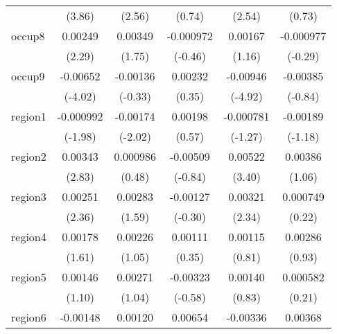 \begin{table}[htbp]
\begin{tabular}{l*{5}{c}}
            &      (3.86)         &      (2.56)         &      (0.74)         &      (2.54)         &      (0.73)         \\
occup8      &     0.00249\sym{*}  &     0.00349         &   -0.000972         &     0.00167         &   -0.000977         \\
            &      (2.29)         &      (1.75)         &     (-0.46)         &      (1.16)         &     (-0.29)         \\
occup9      &    -0.00652\sym{***}&    -0.00136         &     0.00232         &    -0.00946\sym{***}&    -0.00385         \\
            &     (-4.02)         &     (-0.33)         &      (0.35)         &     (-4.92)         &     (-0.84)         \\
region1     &   -0.000992\sym{*}  &    -0.00174\sym{*}  &     0.00198         &   -0.000781         &    -0.00189         \\
            &     (-1.98)         &     (-2.02)         &      (0.57)         &     (-1.27)         &     (-1.18)         \\
region2     &     0.00343\sym{**} &    0.000986         &    -0.00509         &     0.00522\sym{***}&     0.00386         \\
            &      (2.83)         &      (0.48)         &     (-0.84)         &      (3.40)         &      (1.06)         \\
region3     &     0.00251\sym{*}  &     0.00283         &    -0.00127         &     0.00321\sym{*}  &    0.000749         \\
            &      (2.36)         &      (1.59)         &     (-0.30)         &      (2.34)         &      (0.22)         \\
region4     &     0.00178         &     0.00226         &     0.00111         &     0.00115         &     0.00286         \\
            &      (1.61)         &      (1.05)         &      (0.35)         &      (0.81)         &      (0.93)         \\
region5     &     0.00146         &     0.00271         &    -0.00323         &     0.00140         &    0.000582         \\
            &      (1.10)         &      (1.04)         &     (-0.58)         &      (0.83)         &      (0.21)         \\
region6     &    -0.00148         &     0.00120         &     0.00654         &    -0.00336\sym{**} &     0.00368         \\

\end{tabular}
\end{table}
